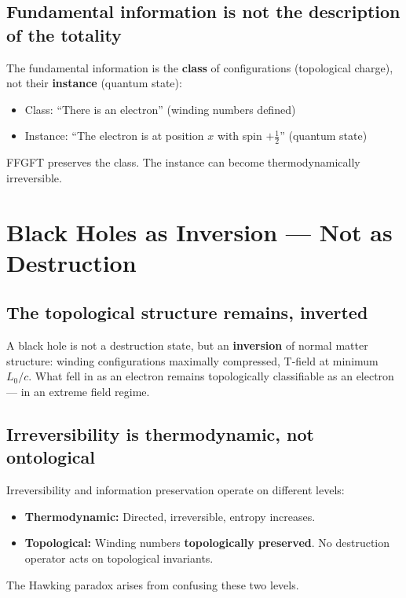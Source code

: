 \subsection{Fundamental information is not the description of the totality}

The fundamental information is the \textbf{class} of configurations (topological charge), not their \textbf{instance} (quantum state):
\begin{itemize}
  \item Class: ``There is an electron'' (winding numbers defined)
  \item Instance: ``The electron is at position $x$ with spin $+\frac{1}{2}$'' (quantum state)
\end{itemize}
FFGFT preserves the class. The instance can become thermodynamically irreversible.

\section{Black Holes as Inversion --- Not as Destruction}

\subsection{The topological structure remains, inverted}

A black hole is not a destruction state, but an \textbf{inversion} of normal matter structure: winding configurations maximally compressed, T-field at minimum $L_0/c$. What fell in as an electron remains topologically classifiable as an electron --- in an extreme field regime.

\subsection{Irreversibility is thermodynamic, not ontological}

\begin{erkenntnis}
Irreversibility and information preservation operate on different levels:
\begin{itemize}
  \item \textbf{Thermodynamic:} Directed, irreversible, entropy increases.
  \item \textbf{Topological:} Winding numbers \textbf{topologically preserved}. No destruction operator acts on topological invariants.
\end{itemize}
The Hawking paradox arises from confusing these two levels.
\end{erkenntnis}

